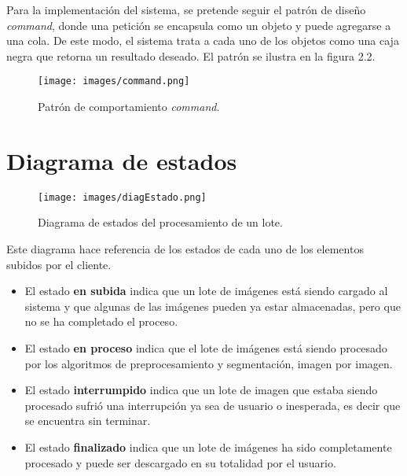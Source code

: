 \documentclass{scrreprt}
\begin{document}
Para la implementación del sistema, se pretende seguir el patrón de diseño \textit{command}, donde una petición se encapsula como un objeto y puede agregarse a una cola. De este modo, el sistema trata a cada uno de los objetos como una caja negra que retorna un resultado deseado. El patrón se ilustra en la figura 2.2.\\

\begin{figure}[H]
	\centering
    \texttt{[image: images/command.png]}
    \caption{Patrón de comportamiento \textit{command}.}\label{diaClases}
\end{figure}


\section{Diagrama de estados}

\begin{figure}[H]
	\centering
    \texttt{[image: images/diagEstado.png]}
    \caption{Diagrama de estados del procesamiento de un lote.}\label{diaEstado}
\end{figure}

Este diagrama hace referencia de los estados de cada uno de los elementos subidos por el cliente. 

\begin{itemize}
	\item El estado  \textbf {en subida} indica que un lote de imágenes está siendo cargado al sistema y que algunas de las imágenes pueden ya estar almacenadas, pero que no se ha completado el proceso.
    
    \item El estado  \textbf {en proceso} indica que el lote de imágenes está siendo procesado por los algoritmos de preprocesamiento y segmentación, imagen por imagen.
    
    \item El estado  \textbf {interrumpido} indica que un lote de imagen que estaba siendo procesado sufrió una interrupción ya sea de usuario o inesperada, es decir que se encuentra sin terminar.
    
    \item El estado  \textbf {finalizado} indica que un lote de imágenes ha sido completamente procesado y puede ser descargado en su totalidad por el usuario.
    
\end{itemize}
\end{document}
